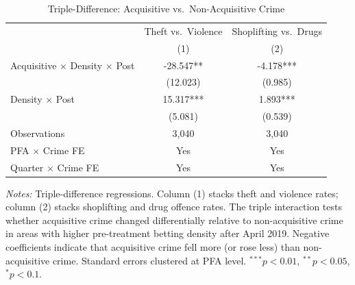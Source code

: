 \begin{table}[htbp]
\centering
\caption{Triple-Difference: Acquisitive vs.\ Non-Acquisitive Crime}
\label{tab:triple}
\begin{threeparttable}
\begin{tabular}{lcc}
\toprule
 & Theft vs.\ Violence & Shoplifting vs.\ Drugs \\
 & (1) & (2) \\
\midrule
Acquisitive $\times$ Density $\times$ Post & -28.547** & -4.178*** \\
 & (12.023) & (0.985) \\
Density $\times$ Post & 15.317*** & 1.893*** \\
 & (5.081) & (0.539) \\
\midrule
Observations & 3,040 & 3,040 \\
PFA $\times$ Crime FE & Yes & Yes \\
Quarter $\times$ Crime FE & Yes & Yes \\
\bottomrule
\end{tabular}
\begin{tablenotes}[flushleft]\footnotesize
\item \textit{Notes:} Triple-difference regressions. Column (1) stacks theft and violence rates; column (2) stacks shoplifting and drug offence rates. The triple interaction tests whether acquisitive crime changed differentially relative to non-acquisitive crime in areas with higher pre-treatment betting density after April 2019. Negative coefficients indicate that acquisitive crime fell more (or rose less) than non-acquisitive crime. Standard errors clustered at PFA level. $^{***}p<0.01$, $^{**}p<0.05$, $^{*}p<0.1$.
\end{tablenotes}
\end{threeparttable}
\end{table}
